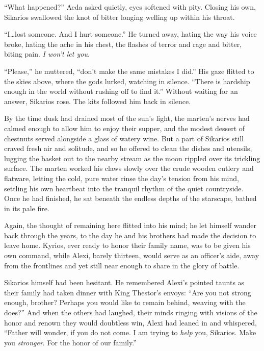 ``What happened?'' Aeda asked quietly, eyes softened with pity. Closing his own, Sikarios swallowed the knot of bitter longing welling up within his throat.

``I\ldots{}lost someone. And I hurt someone.'' He turned away, hating the way his voice broke, hating the ache in his chest, the flashes of terror and rage and bitter, biting pain. \emph{I won't let you}.

``Please,'' he muttered, ``don't make the same mistakes I did.'' His gaze flitted to the skies above, where the gods lurked, watching in silence. ``There is hardship enough in the world without rushing off to find it.'' Without waiting for an answer, Sikarios rose. The kits followed him back in silence.

\secdiv

\noindent By the time dusk had drained most of the sun's light, the marten's nerves had calmed enough to allow him to enjoy their supper, and the modest dessert of chestnuts served alongside a glass of watery wine. But a part of Sikarios still craved fresh air and solitude, and so he offered to clean the dishes and utensils, lugging the basket out to the nearby stream as the moon rippled over its trickling surface. The marten worked his claws slowly over the crude wooden cutlery and flatware, letting the cold, pure water rinse the day's tension from his mind, settling his own heartbeat into the tranquil rhythm of the quiet countryside. Once he had finished, he sat beneath the endless depths of the starscape, bathed in its pale fire.

Again, the thought of remaining here flitted into his mind; he let himself wander back through the years, to the day he and his brothers had made the decision to leave home. Kyrios, ever ready to honor their family name, was to be given his own command, while Alexi, barely thirteen, would serve as an officer's aide, away from the frontlines and yet still near enough to share in the glory of battle.

Sikarios himself had been hesitant. He remembered Alexi's pointed taunts as their family had taken dinner with King Thestor's envoys: ``Are you not strong enough, brother? Perhaps you would like to remain behind, weaving with the does?'' And when the others had laughed, their minds ringing with visions of the honor and renown they would doubtless win, Alexi had leaned in and whispered, ``Father will wonder, if you do not come. I am trying to \emph{help} you, Sikarios. Make you \emph{stronger}. For the honor of our family.''

